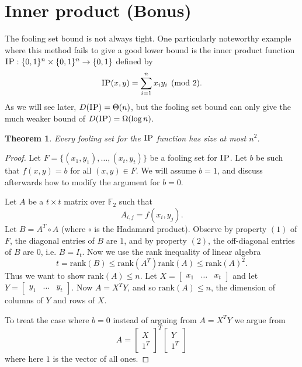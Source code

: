 \documentclass[11pt]{amsart}
\theoremstyle{plain}
\newtheorem{theorem}{Theorem}
\theoremstyle{definition}
\theoremstyle{plain}
\newcommand{\IP}{\textsc{IP}}
\begin{document}
\newpage \section{Inner product (Bonus)}

The fooling set bound is not always tight. One particularly noteworthy example where this method fails to give a good lower bound is the inner product function  $\IP : \{0,1\}^n \times \{0,1\}^n \to \{0,1\}$ defined by
\[
\IP(x,y) = \sum_{i=1}^n x_i y_i \pmod{2}.
\]
As we will see later, $D(\IP) = \Theta(n)$, but the fooling set bound can only give the much weaker bound of $D(\IP) = \Omega(\log n)$.

\begin{theorem}
Every fooling set for the $\IP$ function has size at most $n^2$.
\end{theorem}

\begin{proof}
Let $F = \{(x_1,y_1),\dots, (x_t,y_t)\}$ be a fooling set for $\IP$. Let $b$ be such that $f(x,y) = b$ for all $(x,y) \in F$. We will assume $b=1$, and discuss afterwards how to modify the argument for $b=0$.

Let $A$ be a $t\times t$ matrix over $\mathbb{F}_2$ such that
$$A_{i,j} = f(x_i,y_j).$$
Let $B = A^T\circ A$ (where $\circ$ is the Hadamard product). Observe by property $(1)$ of $F$, the diagonal entries of $B$ are $1$, and by property $(2)$, the off-diagonal entries of $B$ are $0$, i.e. $B = I_t$. Now we use the rank inequality of linear algebra
$$t = \text{rank}(B) \leq \text{rank}(A^T)\text{rank}(A) \leq \text{rank}(A)^2.$$
Thus we want to show $\text{rank}(A) \leq n$. Let $X = \begin{bmatrix}
x_1 & \dots & x_t
\end{bmatrix}$
and let $Y = \begin{bmatrix}
y_1 &\dots & y_t
\end{bmatrix}$. Now $A = X^TY$, and so $\text{rank}(A) \leq n$, the dimension of columns of $Y$ and rows of $X$. 

To treat the case where $b=0$ instead of arguing from $A = X^T Y$ we argue from 
$$A = \begin{bmatrix}
X\\ 1^T
\end{bmatrix}^T\begin{bmatrix}
Y\\ 1^T
\end{bmatrix}$$
where here $1$ is the vector of all ones.
\end{proof}
\end{document}
